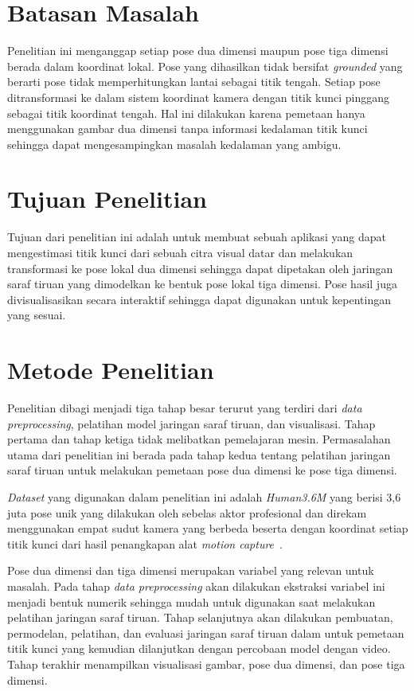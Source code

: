 \section{Batasan Masalah}
\label{sec:1-BatasMasalah}

Penelitian ini menganggap setiap pose dua dimensi maupun pose tiga dimensi berada dalam koordinat
lokal.
Pose yang dihasilkan tidak bersifat \textit{grounded} yang berarti pose tidak memperhitungkan lantai
sebagai titik tengah.
Setiap pose ditransformasi ke dalam sistem koordinat kamera dengan titik kunci pinggang
sebagai titik koordinat tengah. Hal ini dilakukan karena pemetaan hanya menggunakan gambar dua dimensi
tanpa informasi kedalaman titik kunci sehingga dapat mengesampingkan masalah kedalaman yang ambigu.

\section{Tujuan Penelitian}
\label{sec:1-TujuanPenelitian}

Tujuan dari penelitian ini adalah untuk membuat sebuah aplikasi yang dapat mengestimasi titik kunci dari
sebuah citra visual datar dan melakukan transformasi ke pose lokal dua dimensi sehingga dapat
dipetakan oleh jaringan saraf tiruan yang dimodelkan ke bentuk pose lokal tiga dimensi. Pose hasil
juga divisualisasikan secara interaktif sehingga dapat digunakan untuk kepentingan yang sesuai.

\section{Metode Penelitian}
\label{sec:1-MetodePenelitian}

Penelitian dibagi menjadi tiga tahap besar terurut yang terdiri dari \textit{data preprocessing},
pelatihan model jaringan saraf tiruan, dan visualisasi. Tahap pertama dan tahap ketiga tidak
melibatkan pemelajaran mesin. Permasalahan utama dari penelitian ini berada pada tahap kedua tentang
pelatihan jaringan saraf tiruan untuk melakukan pemetaan pose dua dimensi ke pose tiga dimensi.

\textit{Dataset} yang digunakan dalam penelitian ini adalah \textit{Human3.6M} yang berisi 3,6 juta
pose unik yang dilakukan oleh sebelas aktor profesional dan direkam menggunakan empat sudut kamera
yang berbeda beserta dengan koordinat setiap titik kunci dari hasil penangkapan alat
\textit{motion capture}~\cite{h36m_pami}.

Pose dua dimensi dan tiga dimensi merupakan variabel yang relevan untuk masalah. Pada tahap
\textit{data preprocessing} akan dilakukan ekstraksi variabel ini menjadi bentuk numerik sehingga
mudah untuk digunakan saat melakukan pelatihan jaringan saraf tiruan. Tahap selanjutnya akan
dilakukan pembuatan, permodelan, pelatihan, dan evaluasi jaringan saraf tiruan dalam untuk
pemetaan titik kunci yang kemudian dilanjutkan dengan percobaan model dengan video. Tahap terakhir
menampilkan visualisasi gambar, pose dua dimensi, dan pose tiga dimensi.

